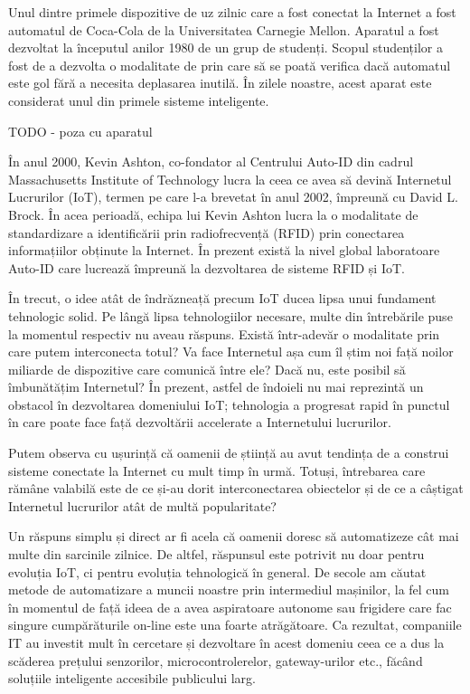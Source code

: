 Unul dintre primele dispozitive de uz zilnic care a fost conectat la Internet a
fost automatul de Coca-Cola de la Universitatea Carnegie Mellon. Aparatul a fost
dezvoltat la începutul anilor 1980 de un grup de studenți. Scopul studenților a
fost de a dezvolta o modalitate de prin care să se poată verifica dacă automatul
este gol fără a necesita deplasarea inutilă. În zilele noastre, acest aparat
este considerat unul din primele sisteme inteligente.

TODO - poza cu aparatul

În anul 2000, Kevin Ashton, co-fondator al Centrului Auto-ID din cadrul
Massachusetts Institute of Technology lucra la ceea ce avea să devină Internetul
Lucrurilor (IoT), termen pe care l-a brevetat în anul 2002, împreună cu David L.
Brock. În acea perioadă, echipa lui Kevin Ashton lucra la o modalitate de
standardizare a identificării prin radiofrecvență (RFID) prin conectarea
informațiilor obținute la Internet. În prezent există la nivel global
laboratoare Auto-ID care lucrează împreună la dezvoltarea de sisteme RFID și
IoT.

În trecut, o idee atât de îndrăzneață precum IoT ducea lipsa unui fundament
tehnologic solid. Pe lângă lipsa tehnologiilor necesare, multe din întrebările
puse la momentul respectiv nu aveau răspuns. Există într-adevăr o modalitate
prin care putem interconecta totul? Va face Internetul așa cum îl știm noi față
noilor miliarde de dispozitive care comunică între ele? Dacă nu, este posibil să
îmbunătățim Internetul? În prezent, astfel de îndoieli nu mai reprezintă un
obstacol în dezvoltarea domeniului IoT; tehnologia a progresat rapid în punctul
în care poate face față dezvoltării accelerate a Internetului lucrurilor.

Putem observa cu ușurință că oamenii de știință au avut tendința de a construi
sisteme conectate la Internet cu mult timp în urmă. Totuși, întrebarea care
rămâne valabilă este de ce și-au dorit interconectarea obiectelor și de ce a
câștigat Internetul lucrurilor atât de multă popularitate?

Un răspuns simplu și direct ar fi acela că oamenii doresc să automatizeze cât
mai multe din sarcinile zilnice. De altfel, răspunsul este potrivit nu doar
pentru evoluția IoT, ci pentru evoluția tehnologică în general. De secole am
căutat metode de automatizare a muncii noastre prin intermediul mașinilor, la
fel cum în momentul de față ideea de a avea aspiratoare autonome sau frigidere
care fac singure cumpărăturile on-line este una foarte atrăgătoare. Ca rezultat,
companiile IT au investit mult în cercetare și dezvoltare în acest domeniu ceea
ce a dus la scăderea prețului senzorilor, microcontrolerelor, gateway-urilor
etc., făcând soluțiile inteligente accesibile publicului larg.


